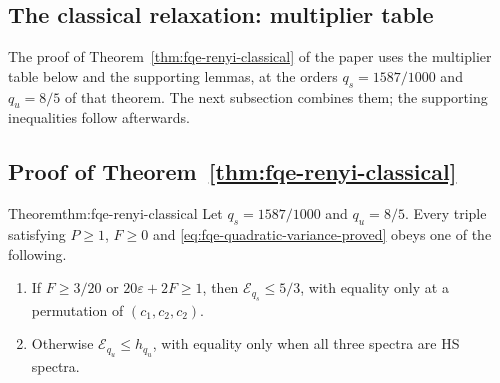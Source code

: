 \subsection{The classical relaxation: multiplier table}\label{sec:sup-renyi-classical}
The proof of Theorem~\ref{thm:fqe-renyi-classical} of the paper uses the multiplier table below and the
supporting lemmas, at the orders $q_s=1587/1000$ and $q_u=8/5$ of that theorem.
The next subsection combines them; the supporting inequalities follow afterwards.



\subsection{Proof of Theorem~\ref{thm:fqe-renyi-classical}}\label{sec:sup-renyi-classical-proof}
\begin{restated}{Theorem}{thm:fqe-renyi-classical}
Let $q_s=1587/1000$ and $q_u=8/5$. Every triple satisfying $P\ge1$, $F\ge0$ and
\eqref{eq:fqe-quadratic-variance-proved} obeys one of the following.
\begin{enumerate}
\item If $F\ge3/20$ or $20\varepsilon+2F\ge1$, then $\mathcal E_{q_s}\le5/3$, with equality only at a permutation of
$(c_1,c_2,c_2)$.
\item Otherwise $\mathcal E_{q_u}\le h_{q_u}$, with equality only when all three spectra are HS spectra.
\end{enumerate}
\end{restated}
